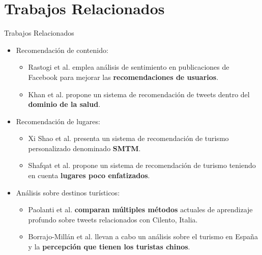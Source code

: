 \documentclass[aspectratio=149]{beamer}
\begin{document}
\section{Trabajos Relacionados}
\begin{frame}[label=relat]{Trabajos Relacionados}
    \begin{itemize}
        \item Recomendación de contenido:
        \begin{itemize}
            \item Rastogi et al. \cite{sent_analysis_facebook_user_recom} emplea análisis de sentimiento en publicaciones de Facebook para mejorar las \textbf{recomendaciones de usuarios}.
            \item Khan et al. \cite{pers_tweet_recomendation} propone un sistema de recomendación de tweets dentro del \textbf{dominio de la salud}.
        \end{itemize}
        \item Recomendación de lugares:
        \begin{itemize}
            \item Xi Shao et al. \cite{8796367} presenta un sistema de recomendación de turismo personalizado denominado \textbf{SMTM}.
            \item Shafqat et al. \cite{recom_mech_under_emph} propone un sistema de recomendación de turismo teniendo en cuenta \textbf{lugares poco enfatizados}.
        \end{itemize}
        \item Análisis sobre destinos turísticos:
        \begin{itemize}
            \item Paolanti et al. \cite {tourism_dest_rec_geolocation} \textbf{comparan múltiples métodos} actuales de aprendizaje profundo sobre tweets relacionados con Cilento, Italia.
            \item Borrajo-Millán et al. \cite{su13116015} llevan a cabo un análisis sobre el turismo en España y la \textbf{percepción que tienen los turistas chinos}.
        \end{itemize}
    \end{itemize}
\end{frame}

\end{document}
